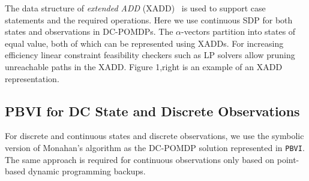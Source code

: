 \documentclass{article} %
\begin{document}
The data structure of \emph{extended ADD} (XADD)~\cite{sanner_uai11} is used to support
case statements and the required operations.  Here we use continuous SDP for both states and observations in DC-POMDPs. The $\alpha$-vectors partition into states of equal value, both of which can be represented using XADDs. For increasing efficiency linear constraint feasibility checkers such as LP solvers allow pruning unreachable paths in the XADD. Figure 1,right is an example of an XADD representation. 

\subsection{PBVI for DC State and Discrete Observations} 

For discrete and continuous states and discrete observations, we use the symbolic version of Monahan's algorithm as the DC-POMDP solution represented in \texttt{PBVI}. The same approach is required for continuous observations only based on point-based dynamic programming backups.
\end{document}
